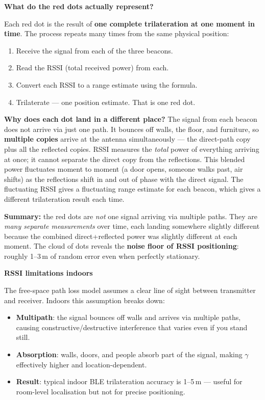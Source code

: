 \documentclass[12pt, a4paper]{article}
\begin{document}
\begin{notebox}
  \textbf{What do the red dots actually represent?}

  Each red dot is the result of \textbf{one complete trilateration
  at one moment in time}.
  The process repeats many times from the same physical position:
  \begin{enumerate}[leftmargin=1.6em,itemsep=2pt]
    \item Receive the signal from each of the three beacons.
    \item Read the RSSI (total received power) from each.
    \item Convert each RSSI to a range estimate using the formula.
    \item Trilaterate --- one position estimate.  That is one red dot.
  \end{enumerate}

  \textbf{Why does each dot land in a different place?}
  The signal from each beacon does not arrive via just one path.
  It bounces off walls, the floor, and furniture, so
  \textbf{multiple copies} arrive at the antenna simultaneously ---
  the direct-path copy plus all the reflected copies.
  RSSI measures the \emph{total} power of everything arriving at once;
  it cannot separate the direct copy from the reflections.
  This blended power fluctuates moment to moment (a door opens,
  someone walks past, air shifts) as the reflections shift in and out
  of phase with the direct signal.
  The fluctuating RSSI gives a fluctuating range estimate for each
  beacon, which gives a different trilateration result each time.

  \textbf{Summary:} the red dots are \emph{not} one signal arriving via
  multiple paths.
  They are \emph{many separate measurements} over time, each landing
  somewhere slightly different because the combined direct+reflected
  power was slightly different at each moment.
  The cloud of dots reveals the \textbf{noise floor of RSSI
  positioning}: roughly 1--3\,m of random error even when perfectly
  stationary.
\end{notebox}

\begin{warnbox}
  \textbf{RSSI limitations indoors}

  The free-space path loss model assumes a clear line of sight between
  transmitter and receiver.
  Indoors this assumption breaks down:
  \begin{itemize}[leftmargin=1.2em,itemsep=2pt]
    \item \textbf{Multipath}: the signal bounces off walls and arrives
      via multiple paths, causing constructive/destructive interference
      that varies even if you stand still.
    \item \textbf{Absorption}: walls, doors, and people absorb part of
      the signal, making $\gamma$ effectively higher and
      location-dependent.
    \item \textbf{Result}: typical indoor BLE trilateration accuracy is
      1--5\,m --- useful for room-level localisation but not for
      precise positioning.
  \end{itemize}
\end{warnbox}
\end{document}
